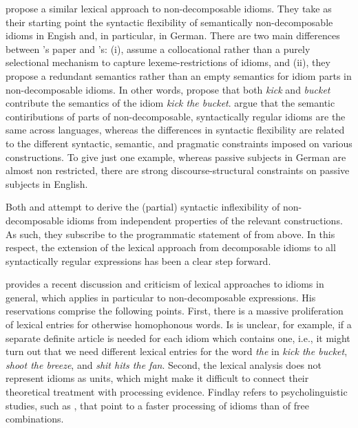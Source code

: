 \documentclass[output=paper]{langsci/langscibook}
\begin{document}
\medskip%
\cite{Bargmann:Sailer:18} propose a similar lexical approach to non-de\-com\-pos\-able idioms. 
They take as their starting point the syntactic flexibility of semantically non-decomposable idioms in Engish and, in particular, in German.
There are two main differences between \citeauthor{KSF2015a}'s paper and \citeauthor{Bargmann:Sailer:18}'s: (i), \citeauthor{Bargmann:Sailer:18} assume a collocational rather than a purely selectional mechanism to capture lexeme-restrictions of idioms, and (ii), they propose a redundant semantics rather than an empty semantics for idiom parts in non-decomposable idioms. In other words, \cite{Bargmann:Sailer:18} propose that both \emph{kick} and \emph{bucket} contribute the semantics of the idiom \emph{kick the bucket}. 
\citeauthor{Bargmann:Sailer:18} argue that the semantic contiributions of parts of non-decomposable, syntactically regular idioms are the same across languages, whereas the differences in syntactic flexibility are related to the different syntactic, semantic, and pragmatic constraints imposed on various constructions. 
To give just one example, whereas passive subjects in German are almost non restricted, there are strong discourse-structural constraints on passive subjects in English.

Both \cite{KSF2015a} and \cite{Bargmann:Sailer:18} attempt to derive the (partial) syntactic inflexibility of non-decomposable idioms from independent properties of the relevant constructions. 
As such, they subscribe to the programmatic statement of \cite{NSW94a} from  above.  
In this respect, the extension of the lexical approach from decomposable idioms to all syntactically regular expressions has been a clear step forward. 

\bigskip%
\cite{Findlay:17} provides a recent discussion and criticism of lexical approaches to idioms in general, which applies in particular to non-decomposable expressions. 
His reservations comprise the following points. 
First, there is a massive proliferation of lexical entries for otherwise homophonous words. Is is unclear, for example, if a separate definite article is needed for each idiom which contains one, i.e., it might turn out that we need different lexical entries for the word \emph{the} in \emph{kick the bucket}, \emph{shoot the breeze}, and \emph{shit hits the fan}. 
Second, the lexical analysis does not represent idioms as units, which might make it difficult to connect their theoretical treatment with processing evidence. Findlay refers to psycholinguistic studies, such as \cite{Swinney:Cutler:79}, that point to a faster processing of idioms than of free combinations. 
\end{document}
